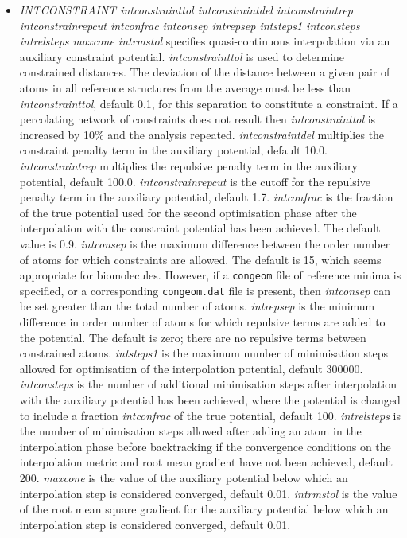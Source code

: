 \documentclass[12pt,a4paper,dvips]{article}
\begin{document}
\begin{itemize}
      
\item{\it INTCONSTRAINT intconstrainttol intconstraintdel intconstraintrep intconstrainrepcut 
intconfrac intconsep intrepsep intsteps1 intconsteps intrelsteps maxcone intrmstol\/} 
specifies quasi-continuous interpolation via an auxiliary constraint potential.
{\it intconstrainttol\/} is used to determine constrained distances. The deviation
of the distance between a given pair of atoms
in all reference structures from the average must be less than
{\it intconstrainttol\/}, default 0.1, for this separation to constitute a constraint.
If a percolating network of constraints does not result then {\it intconstrainttol\/}
is increased by 10\% and the analysis repeated.
{\it intconstraintdel\/} multiplies the constraint penalty term in the auxiliary potential,
default 10.0.
{\it intconstraintrep\/} multiplies the repulsive penalty term in the auxiliary potential,
default 100.0.
{\it intconstrainrepcut\/} is the cutoff for the repulsive penalty term in the auxiliary potential,
default 1.7.
{\it intconfrac\/} is the fraction of the true potential used for the second optimisation
phase after the interpolation with the constraint potential has been achieved. The
default value is 0.9.
{\it intconsep\/} is the maximum difference between the order number of atoms for
which constraints are allowed. The default is 15, which seems appropriate for 
biomolecules. However, if a {\tt congeom} file of reference minima is specified, or
a corresponding {\tt congeom.dat} file is present, then {\it intconsep\/} can be set
greater than the total number of atoms.
{\it intrepsep} is the minimum difference in order number of atoms for which repulsive
terms are added to the potential. The default is zero; there are no repulsive terms
between constrained atoms.
{\it intsteps1} is the maximum number of minimisation steps allowed for optimisation
of the interpolation potential, default 300000.
{\it intconsteps\/} is the number of additional minimisation steps after interpolation
with the auxiliary potential has been achieved, where the potential is changed to 
include a fraction {\it intconfrac\/} of the true potential, default 100.
{\it intrelsteps\/} is the number of minimisation steps allowed after adding an atom
in the interpolation phase before backtracking if the convergence conditions on the
interpolation metric and root mean gradient have not been achieved, default 200.
{\it maxcone\/} is the value of the auxiliary potential below which an interpolation
step is considered converged, default 0.01.
{\it intrmstol\/} is the value of the root mean square gradient for
the auxiliary potential below which an interpolation
step is considered converged, default 0.01.


\end{itemize}
\end{document}
